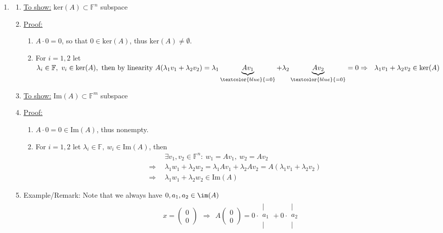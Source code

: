 {\color{solution}
\begin{enumerate}
	\item 	
	\begin{enumerate}
		\item 	\underline{To show:} $\text{ker}(A)\subset\mathbb{F}^n$ subspace 
		\item[] 	\underline{Proof:}
		\begin{enumerate}
			\item $A\cdot0=0$, so that $0\in\text{ker}(A)$, thus $\text{ker}(A)\neq \emptyset$.
			\item For $i=1,2$ let $\lambda_i\in\mathbb{F},~v_i\in\text{ker}(A),~\text{then by linearity}~
			A(\lambda_1v_1+ \lambda_2v_2)
			=\lambda_1\underbrace{Av_1}_{\textcolor{blue}{=0}}+\lambda_2\underbrace{Av_2}_{\textcolor{blue}{=0}}=0\\
			\Rightarrow~~\lambda_1v_1+ \lambda_2v_2\in\text{ker}(A)$
		\end{enumerate}
		\item \underline{To show:} $\text{Im}(A)\subset\mathbb{F}^m$ subspace
		\item[] 	\underline{Proof:}
		\begin{enumerate}
			\item $A\cdot0=0\in\text{Im}(A)$, thus nonempty.
			\item For $i=1,2$ let $\lambda_i\in\mathbb{F},~w_i\in\text{Im}(A)$, then
			\begin{align*}
			~~&\exists v_1,v_2\in \mathbb{F}^n:~w_1=Av_1,~w_2=Av_2\\
			\Rightarrow~~&\lambda_1 w_1+ \lambda_2 w_2=\lambda_1 Av_1+\lambda_2Av_2=A(\lambda_1 v_1+\lambda_2 v_2)\\
			\Rightarrow~~&\lambda_1 w_1+ \lambda_2w_2\in\text{Im}(A)
			\end{align*}
		\end{enumerate}
		\item[] Example/Remark:
				Note that we always have $0, a_1, a_2 \in \im(A)$\\
	\begin{align*}
		&x=\begin{pmatrix}0\\0\end{pmatrix}~~
	\Rightarrow~~A\begin{pmatrix}0\\0\end{pmatrix}
	=0\cdot\begin{matrix}|\\a_1\\|\end{matrix}+0\cdot\begin{matrix}|\\a_2\\|\end{matrix}

\end{align*}
\end{enumerate}
\end{enumerate}}
